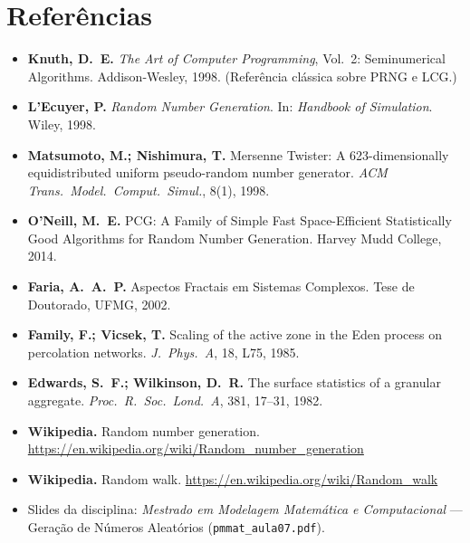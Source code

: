 \documentclass[12pt,a4paper]{article}
\begin{document}
\section*{Refer\^encias}

\begin{itemize}
  \item \textbf{Knuth, D.\ E.} \textit{The Art of Computer Programming}, Vol.\ 2: Seminumerical Algorithms. Addison-Wesley, 1998. (Refer\^encia cl\'assica sobre PRNG e LCG.)
  \item \textbf{L'Ecuyer, P.} \textit{Random Number Generation}. In: \textit{Handbook of Simulation}. Wiley, 1998.
  \item \textbf{Matsumoto, M.; Nishimura, T.} Mersenne Twister: A 623-dimensionally equidistributed uniform pseudo-random number generator. \textit{ACM Trans.\ Model.\ Comput.\ Simul.}, 8(1), 1998.
  \item \textbf{O'Neill, M.\ E.} PCG: A Family of Simple Fast Space-Efficient Statistically Good Algorithms for Random Number Generation. Harvey Mudd College, 2014.
  \item \textbf{Faria, A.\ A.\ P.} Aspectos Fractais em Sistemas Complexos. Tese de Doutorado, UFMG, 2002.
  \item \textbf{Family, F.; Vicsek, T.} Scaling of the active zone in the Eden process on percolation networks. \textit{J.\ Phys.\ A}, 18, L75, 1985.
  \item \textbf{Edwards, S.\ F.; Wilkinson, D.\ R.} The surface statistics of a granular aggregate. \textit{Proc.\ R.\ Soc.\ Lond.\ A}, 381, 17--31, 1982.
  \item \textbf{Wikipedia.} Random number generation. \url{https://en.wikipedia.org/wiki/Random_number_generation}
  \item \textbf{Wikipedia.} Random walk. \url{https://en.wikipedia.org/wiki/Random_walk}
  \item Slides da disciplina: \textit{Mestrado em Modelagem Matem\'atica e Computacional} --- Gera\c{c}\~ao de N\'umeros Aleat\'orios (\texttt{pmmat\_aula07.pdf}).
\end{itemize}
\end{document}
